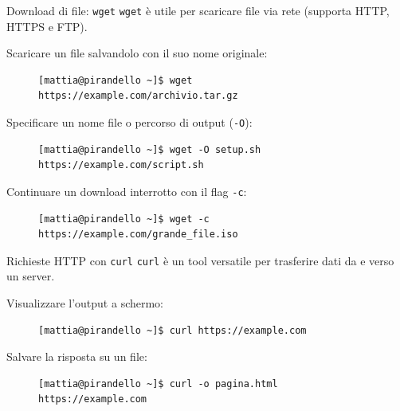 \begin{frame}[fragile]{Download di file: \texttt{wget}}
  \texttt{wget} è utile per scaricare file via rete (supporta HTTP, HTTPS e FTP).

  Scaricare un file salvandolo con il suo nome originale:
  \begin{figure}
    \begin{lstlisting}[backgroundcolor=\color{expowhite!50!white}]
[mattia@pirandello ~]$ wget https://example.com/archivio.tar.gz
\end{lstlisting}
  \end{figure}

  Specificare un nome file o percorso di output (\texttt{-O}):
  \begin{figure}
    \begin{lstlisting}[backgroundcolor=\color{expowhite!50!white}]
[mattia@pirandello ~]$ wget -O setup.sh https://example.com/script.sh
\end{lstlisting}
  \end{figure}

  Continuare un download interrotto con il flag \texttt{-c}:
  \begin{figure}
    \begin{lstlisting}[backgroundcolor=\color{expowhite!50!white}]
[mattia@pirandello ~]$ wget -c https://example.com/grande_file.iso
\end{lstlisting}
  \end{figure}
\end{frame}

\begin{frame}[fragile]{Richieste HTTP con \texttt{curl}}
  \texttt{curl} è un tool versatile per trasferire dati da e verso un server. 

  Visualizzare l'output a schermo:
  \begin{figure}
    \begin{lstlisting}[backgroundcolor=\color{expowhite!50!white}]
[mattia@pirandello ~]$ curl https://example.com
\end{lstlisting}
  \end{figure}

  Salvare la risposta su un file:
  \begin{figure}
    \begin{lstlisting}[backgroundcolor=\color{expowhite!50!white}]
[mattia@pirandello ~]$ curl -o pagina.html https://example.com
\end{lstlisting}
  \end{figure}\medskip
\end{frame}

